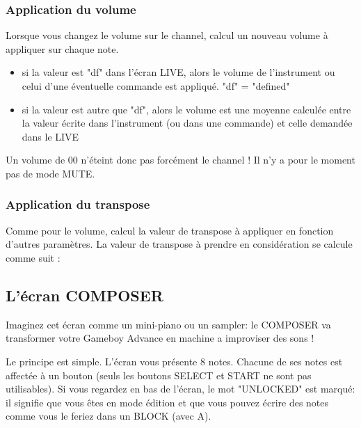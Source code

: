 \documentclass[12pt,a4paper]{article}
\begin{document}
    \subsubsection{Application du volume}

    Lorsque vous changez le volume sur le channel, \FAT calcul un nouveau volume à appliquer sur chaque note. \medskip

    \begin{itemize}
        \item{si la valeur est "df" dans l'écran LIVE, alors le volume de l'instrument ou celui d'une éventuelle commande est appliqué. "df" = "defined"}
        \item{si la valeur est autre que "df", alors le volume est une moyenne calculée entre la valeur écrite dans l'instrument (ou dans une commande) et celle demandée dans le LIVE}
    \end{itemize}
    \medskip

    Un volume de 00 n'éteint donc pas forcément le channel ! Il n'y a pour le moment pas de mode MUTE.

    \subsubsection{Application du transpose}

    Comme pour le volume, \FAT calcul la valeur de transpose à appliquer en fonction d'autres paramètres. La valeur de transpose à prendre en considération se calcule comme suit :


    \subsection{L'écran COMPOSER}
    
    Imaginez cet écran comme un mini-piano ou un sampler: le COMPOSER va transformer votre Gameboy Advance en machine a improviser des sons !
    
    
    Le principe est simple. L'écran vous présente 8 notes. Chacune de ses notes est affectée à un bouton (seuls les boutons SELECT et START ne sont pas utilisables). Si vous regardez en bas de l'écran, le mot "UNLOCKED" est marqué: il signifie que vous êtes en mode édition et que vous pouvez écrire des notes comme vous le feriez dans un BLOCK (avec A). \medskip
    
\end{document}
